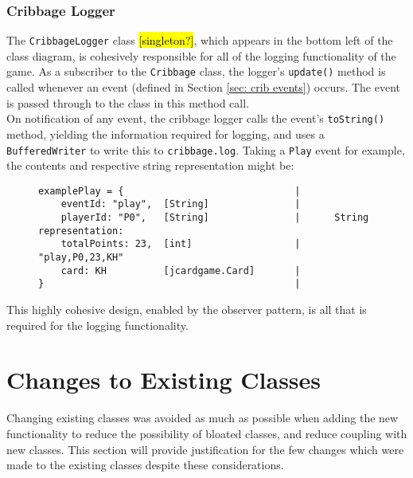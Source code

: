 \documentclass{article}
\begin{document}
\subsubsection{Cribbage Logger}
\label{sec: crib logger}
The \verb|CribbageLogger| class \hl{[singleton?]}, which appears in the bottom left of the class diagram, is cohesively responsible for all of the logging functionality of the game. As a subscriber to the \verb|Cribbage| class, the logger's \verb|update()| method is called whenever an event (defined in Section \ref{sec: crib events}) occurs. The event is passed through to the class in this method call.\\[2mm]
On notification of any event, the cribbage logger calls the event's \verb|toString()| method, yielding the information required for logging, and uses a \verb|BufferedWriter| to write this to \verb|cribbage.log|. Taking a \verb|Play| event for example, the contents and respective string representation might be:
\begin{figure}[H]
\centering
\begin{BVerbatim}
examplePlay = {                              |
    eventId: "play",  [String]               |
    playerId: "P0",   [String]               |      String representation:
    totalPoints: 23,  [int]                  |      "play,P0,23,KH"
    card: KH          [jcardgame.Card]       |  
}                                            |
\end{BVerbatim}
\end{figure}
\noindent This highly cohesive design, enabled by the observer pattern, is all that is required for the logging functionality.

\section{Changes to Existing Classes}
Changing existing classes was avoided as much as possible when adding the new functionality to reduce the possibility of bloated classes, and reduce coupling with new classes. This section will provide justification for the few changes which were made to the existing classes despite these considerations.
\end{document}
